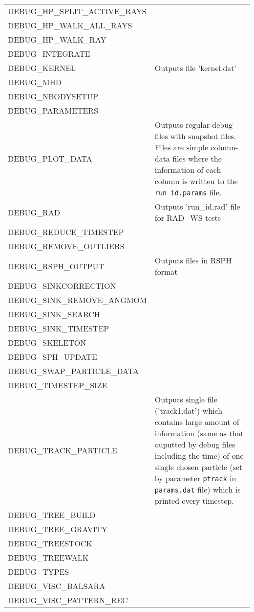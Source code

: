 \documentclass[a4paper]{article}
\newcommand{\NAME}{SEREN }
\newcommand{\var}[1]{\texttt{#1}}
\begin{document}
\begin{center}
\begin{supertabular}{|p{6cm}|p{8cm}|}
DEBUG\_HP\_SPLIT\_ACTIVE\_RAYS & \\
DEBUG\_HP\_WALK\_ALL\_RAYS  & \\
DEBUG\_HP\_WALK\_RAY        & \\
DEBUG\_INTEGRATE            & \\
DEBUG\_KERNEL               & Outputs file 'kernel.dat' \\
DEBUG\_MHD                  & \\
DEBUG\_NBODYSETUP           & \\
DEBUG\_PARAMETERS           & \\
DEBUG\_PLOT\_DATA           & Outputs regular debug files with snapshot files.
                              Files are simple column-data files where the 
                              information of each column is written to the 
                              \var{run\_id.params} file.\\
DEBUG\_RAD                  & Outputs 'run\_id.rad' file for RAD\_WS tests \\
DEBUG\_REDUCE\_TIMESTEP     & \\
DEBUG\_REMOVE\_OUTLIERS     & \\
DEBUG\_RSPH\_OUTPUT         & Outputs files in RSPH format \\
DEBUG\_SINKCORRECTION       & \\
DEBUG\_SINK\_REMOVE\_ANGMOM & \\
DEBUG\_SINK\_SEARCH         & \\
DEBUG\_SINK\_TIMESTEP       & \\
DEBUG\_SKELETON             & \\
DEBUG\_SPH\_UPDATE          & \\
DEBUG\_SWAP\_PARTICLE\_DATA & \\
DEBUG\_TIMESTEP\_SIZE       & \\
DEBUG\_TRACK\_PARTICLE      & Outputs single file ('track1.dat') which 
                              contains large amount of information (same as 
                              that ouputted by debug files including the time) 
                              of one single chosen particle (set by parameter 
                              \var{ptrack} in \var{params.dat} file) which is 
                              printed every timestep. \\
DEBUG\_TREE\_BUILD          & \\
DEBUG\_TREE\_GRAVITY        & \\
DEBUG\_TREESTOCK            & \\
DEBUG\_TREEWALK             & \\
DEBUG\_TYPES                & \\
DEBUG\_VISC\_BALSARA        & \\
DEBUG\_VISC\_PATTERN\_REC   & \\
\end{supertabular}
\end{center}
\end{document}
